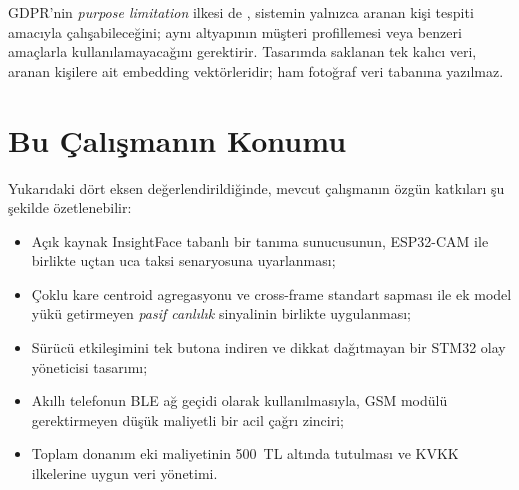 GDPR'nin \emph{purpose limitation} ilkesi de \cite{gdpr2018}, sistemin
yalnızca aranan kişi tespiti amacıyla çalışabileceğini; aynı altyapının
müşteri profillemesi veya benzeri amaçlarla kullanılamayacağını
gerektirir. Tasarımda saklanan tek kalıcı veri, aranan kişilere ait
embedding vektörleridir; ham fotoğraf veri tabanına yazılmaz.

\section{Bu Çalışmanın Konumu}

Yukarıdaki dört eksen değerlendirildiğinde, mevcut çalışmanın özgün
katkıları şu şekilde özetlenebilir:

\begin{itemize}
    \item Açık kaynak InsightFace tabanlı bir tanıma sunucusunun, ESP32-CAM
          ile birlikte uçtan uca taksi senaryosuna uyarlanması;
    \item Çoklu kare centroid agregasyonu ve cross-frame standart sapması
          ile ek model yükü getirmeyen \emph{pasif canlılık} sinyalinin
          birlikte uygulanması;
    \item Sürücü etkileşimini tek butona indiren ve dikkat dağıtmayan bir
          STM32 olay yöneticisi tasarımı;
    \item Akıllı telefonun BLE ağ geçidi olarak kullanılmasıyla, GSM
          modülü gerektirmeyen düşük maliyetli bir acil çağrı zinciri;
    \item Toplam donanım eki maliyetinin 500~TL altında tutulması ve KVKK
          ilkelerine uygun veri yönetimi.
\end{itemize}
